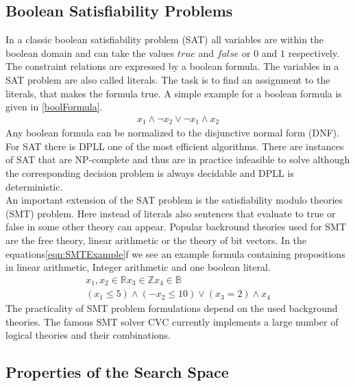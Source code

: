 \subsection{Boolean Satisfiability Problems}
In a classic boolean satisfiability problem (SAT) all variables are within the boolean domain and can take the values $true$ and $false$ or $0$ and $1$ respectively. The constraint relations are expressed by a boolean formula. The variables in a SAT problem are also called literals. The task is to find an assignment to the literals, that makes the formula true. A simple example for a boolean formula is given in \ref{boolFormula}.
\begin{eqnarray}
x_1 \land \neg x_2  \lor \neg x_1 \land {x_2}
\label{boolFormula}
\end{eqnarray}
Any boolean formula can be normalized to the disjunctive normal form (DNF). For SAT there is DPLL\cite{DPLL} one of the most efficient algorithms. There are instances of SAT that are NP-complete and thus are in practice infeasible to solve although the corresponding decision problem is always decidable and DPLL is deterministic.\\
An important extension of the SAT problem is the satisfiability modulo theories (SMT) problem. Here instead of literals also sentences that evaluate to true or false in some other theory can appear. Popular backround theories used for SMT are the free theory, linear arithmetic or the theory of bit vectors. In the equations\ref{eqn:SMTExample}f we see an example formula containing propositions in linear arithmetic, Integer arithmetic and one boolean literal.
\begin{eqnarray}
\label{eqn:SMTExample}
x_1,x_2\in \mathbb{R} x_3 \in \mathbb{Z} x_4\in \mathbb{B}\\
(x_1\leq 5) \land (-x_2\leq 10) \lor (x_3=2) \land x_4
\end{eqnarray}
The practicality of SMT problem formulations depend on the used background theories. The famous SMT solver CVC currently implements a large number of logical theories and their combinations\cite{cvc}.

\subsection{Properties of the Search Space}
